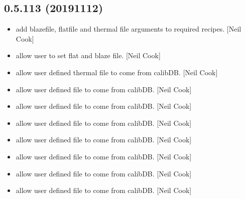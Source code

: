 \documentclass[a4paper,10pt,english]{report}
\begin{document}
\subsection{0.5.113 (2019\sphinxhyphen{}11\sphinxhyphen{}12)}
\label{\detokenize{misc/changelog:id49}}\begin{itemize}
\item {} 
 \sphinxhyphen{} add blazefile, flatfile
and thermal file arguments to required recipes. {[}Neil Cook{]}

\item {} 
 \sphinxhyphen{} allow user to set flat and blaze file.
{[}Neil Cook{]}

\item {} 
 \sphinxhyphen{} allow user defined thermal file to come from
calibDB. {[}Neil Cook{]}

\item {} 
 \sphinxhyphen{} allow user defined file to come from calibDB. {[}Neil
Cook{]}

\item {} 
 \sphinxhyphen{} allow user defined file to come from calibDB. {[}Neil
Cook{]}

\item {} 
 \sphinxhyphen{} allow user defined file to come from calibDB. {[}Neil
Cook{]}

\item {} 
 \sphinxhyphen{} allow user defined file to come from calibDB.
{[}Neil Cook{]}

\item {} 
 \sphinxhyphen{} allow user defined file to come from calibDB. {[}Neil
Cook{]}

\item {} 
 \sphinxhyphen{} allow user defined file to come from calibDB. {[}Neil
Cook{]}

\item {} 
 \sphinxhyphen{} allow user defined file to come from calibDB.
{[}Neil Cook{]}

\end{itemize}
\end{document}
